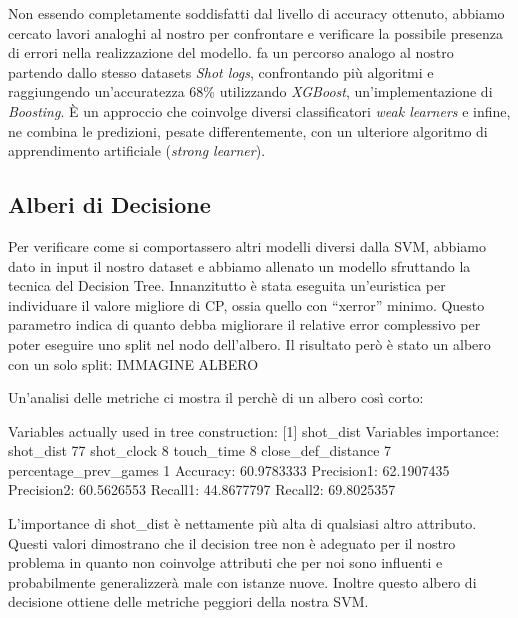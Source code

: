 \par
Non essendo completamente soddisfatti dal livello di accuracy ottenuto, abbiamo cercato lavori analoghi al nostro per confrontare e verificare la possibile presenza di errori nella realizzazione del modello. \cite{predictingNBAst} fa un percorso analogo al nostro partendo dallo stesso datasets \textit{Shot logs}, confrontando più algoritmi e raggiungendo un'accuratezza  68\% utilizzando \textit{XGBoost}, un'implementazione di \textit{Boosting}. È un approccio che coinvolge diversi classificatori \textit{weak learners} e infine, ne combina le predizioni, pesate differentemente, con un ulteriore algoritmo di apprendimento artificiale (\textit{strong learner}).

\subsection{Alberi di Decisione}
Per verificare come si comportassero altri modelli diversi dalla SVM, abbiamo dato in input il nostro dataset e abbiamo allenato un modello sfruttando la tecnica del Decision Tree.
Innanzitutto è stata eseguita un’euristica per individuare il valore migliore di CP, ossia quello con “xerror” minimo. Questo parametro indica di quanto debba migliorare il relative error complessivo per poter eseguire uno split nel nodo dell'albero.
Il risultato però è stato un albero con un solo split:
IMMAGINE ALBERO

Un’analisi delle metriche ci mostra il perchè di un albero così corto:

Variables actually used in tree construction:
[1] shot\_dist
Variables importance:
shot\_dist 77
shot\_clock 8
touch\_time 8
close\_def\_distance 7
percentage\_prev\_games 1
Accuracy: 60.9783333
Precision1: 62.1907435
Precision2: 60.5626553
Recall1: 44.8677797
Recall2: 69.8025357

L’importance di shot\_dist è nettamente più alta di qualsiasi altro attributo.
Questi valori dimostrano che il decision tree non è adeguato per il nostro problema in quanto non coinvolge attributi che per noi sono influenti e probabilmente generalizzerà male con istanze nuove.
Inoltre questo albero di decisione ottiene delle metriche peggiori della nostra SVM.

